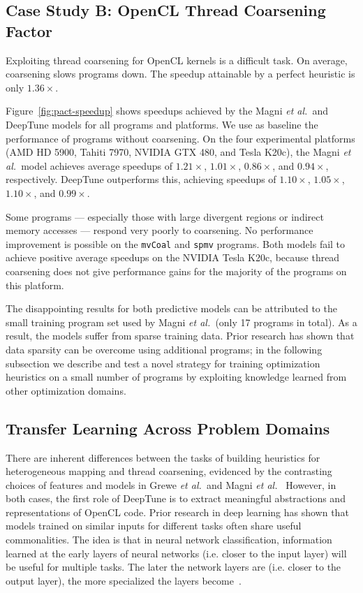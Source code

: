 



\subsection{Case Study B: OpenCL Thread Coarsening Factor}



Exploiting thread coarsening for OpenCL kernels is a difficult task. On average, coarsening slows programs down. The speedup attainable by a perfect heuristic is only $1.36\times$.

Figure~\ref{fig:pact-speedup} shows speedups achieved by the Magni \emph{et al.\ }and DeepTune models for all programs and platforms. We use as baseline the performance of programs without coarsening.  On the four experimental platforms (AMD HD 5900, Tahiti 7970, NVIDIA GTX 480, and Tesla K20c), the Magni \emph{et al.\ }model achieves average speedups of $1.21\times$, $1.01\times$, $0.86\times$, and $0.94\times$, respectively. DeepTune outperforms this, achieving speedups of $1.10\times$, $1.05\times$, $1.10\times$, and $0.99\times$.

Some programs --- especially those with large divergent regions or indirect memory accesses --- respond very poorly to coarsening. No performance improvement is possible on the \texttt{mvCoal} and \texttt{spmv} programs. Both models fail to achieve positive average speedups on the NVIDIA Tesla K20c, because thread coarsening does not give performance gains for the majority of the programs on this platform.

The disappointing results for both predictive models can be attributed to the small training program set used by Magni \emph{et al.\ }(only 17 programs in total). As a result, the models suffer from sparse training data. Prior research has shown that data sparsity can be overcome using additional programs; in the following subsection we describe and test a novel strategy for training optimization heuristics on a small number of programs by exploiting knowledge learned from other optimization domains.


\subsection{Transfer Learning Across Problem Domains}\label{subsec:tl}

There are inherent differences between the tasks of building heuristics for heterogeneous mapping and thread coarsening, evidenced by the contrasting choices of features and models in Grewe \emph{et al.\ }and Magni \emph{et al.\ } However, in both cases, the first role of DeepTune is to extract meaningful abstractions and representations of OpenCL code. Prior research in deep learning has shown that models trained on similar inputs for different tasks often share useful commonalities. The idea is that in neural network classification, information learned at the early layers of neural networks (i.e. closer to the input layer) will be useful for multiple tasks. The later the network layers are (i.e. closer to the output layer), the more specialized the layers become~\cite{Zeiler2014}.

